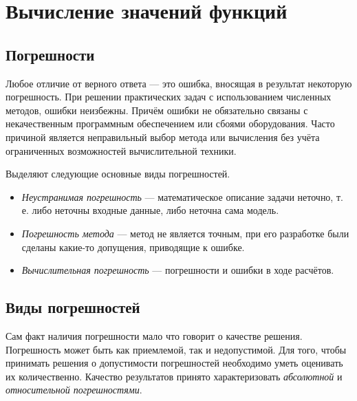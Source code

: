 \section{Вычисление значений функций}


\subsection{Погрешности}

Любое отличие от верного ответа — это ошибка, вносящая в результат
некоторую погрешность. При решении практических задач с использованием
численных методов, ошибки неизбежны. Причём ошибки не обязательно
связаны с некачественным программным обеспечением или сбоями оборудования.
Часто причиной является неправильный выбор метода или вычисления без
учёта ограниченных возможностей вычислительной техники.

Выделяют следующие основные виды погрешностей.
\begin{itemize}
\item \emph{Неустранимая погрешность} — математическое описание задачи неточно,
т. е. либо неточны входные данные, либо неточна сама модель.
\item \emph{Погрешность метода} — метод не является точным, при его разработке
были сделаны какие-то допущения, приводящие к ошибке.
\item \emph{Вычислительная погрешность} — погрешности и ошибки в ходе расчётов.
\end{itemize}

\subsection{Виды погрешностей}

Сам факт наличия погрешности мало что говорит о качестве решения.
Погрешность может быть как приемлемой, так и недопустимой. Для того,
чтобы принимать решения о допустимости погрешностей необходимо уметь
оценивать их количественно. Качество результатов принято характеризовать
\emph{абсолютной} и \emph{относительной погрешностями}.

